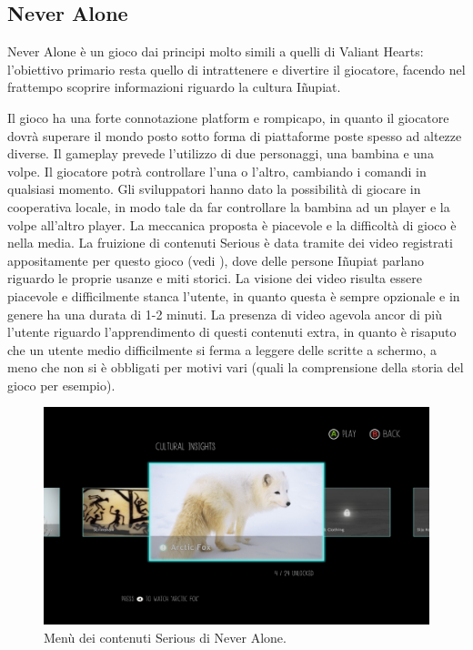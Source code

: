 \subsection{Never Alone}
\label{sec:stato_arte_never_alone}

Never Alone è un gioco dai principi molto simili a quelli di Valiant Hearts: l'obiettivo primario resta quello di intrattenere e divertire il giocatore, facendo nel frattempo scoprire informazioni riguardo la cultura Iñupiat.

Il gioco ha una forte connotazione platform e rompicapo, in quanto il giocatore dovrà superare il mondo posto sotto forma di piattaforme poste spesso ad altezze diverse. Il gameplay prevede l'utilizzo di due personaggi, una bambina e una volpe. Il giocatore potrà controllare l'una o l'altro, cambiando i comandi in qualsiasi momento. Gli sviluppatori hanno dato la possibilità di giocare in cooperativa locale, in modo tale da far controllare la bambina ad un player e la volpe all'altro player.
La meccanica proposta è piacevole e la difficoltà di gioco è nella media. La fruizione di contenuti Serious è data tramite dei video registrati appositamente per questo gioco (vedi \myfig{\ref{fig:videona}}), dove delle persone Iñupiat parlano riguardo le proprie usanze e miti storici. La visione dei video risulta essere piacevole e difficilmente stanca l'utente, in quanto questa è sempre opzionale e in genere ha una durata di 1-2 minuti. La presenza di video agevola ancor di più l'utente riguardo l'apprendimento di questi contenuti extra, in quanto è risaputo che un utente medio difficilmente si ferma a leggere delle scritte a schermo, a meno che non si è obbligati per motivi vari (quali la comprensione della storia del gioco per esempio).

\begin{figure}[h]
\centerline{\includegraphics[scale=0.22]{images/statoarte/videona.jpg}}
\caption{Menù dei contenuti Serious di Never Alone.}
\label{fig:videona}
\end{figure}

